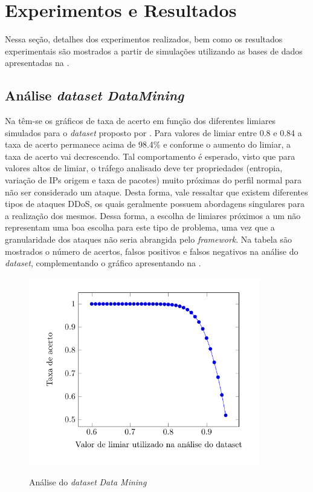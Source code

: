 \chapter[Resultados]{Experimentos e Resultados}
\label{resultados}
Nessa seção, detalhes dos experimentos realizados, bem como os resultados experimentais são mostrados a partir de simulações utilizando as bases de dados apresentadas na .

\section{Análise \textit{dataset DataMining}}  
Na  têm-se os gráficos de taxa de acerto em função dos diferentes limiares simulados para o \textit{dataset} proposto por \cite{DataMining}. Para valores de limiar entre 0.8 e 0.84 a taxa de acerto permanece acima de 98.4\% e conforme o aumento do limiar, a taxa de acerto vai decrescendo. Tal comportamento é esperado, visto que para valores altos de limiar, o tráfego analisado deve ter propriedades (entropia, variação de IPs origem e taxa de pacotes) muito próximas do perfil normal para não ser considerado um ataque. Desta forma, vale ressaltar que existem diferentes tipos de ataques DDoS, os quais geralmente possuem abordagens singulares para a realização dos mesmos. Dessa forma, a escolha de limiares próximos a um não representam uma boa escolha para este tipo de problema, uma vez que a granularidade dos ataques não seria abrangida pelo \textit{framework}. Na tabela  são mostrados  o número de acertos, falsos positivos e falsos negativos na análise do \textit{dataset}, complementando o gráfico apresentando na .

 \begin{figure}[htb]
 	\centering
 	\caption{Análise do \textit{dataset} \textit{Data Mining} }
 	\includegraphics[width=0.9\textwidth]{figs/results80-95Mining.pdf}\\
 	\hspace{1.5cm}{Fonte: Elaborada pelo autor.}
 	\label{fig:ResultsMining}
 \end{figure}
 
